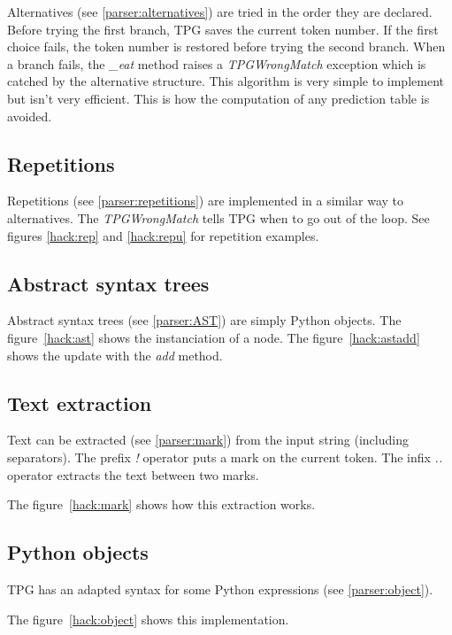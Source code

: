 Alternatives (see \ref{parser:alternatives}) are tried in the order they are declared.
Before trying the first branch, TPG saves the current token number.
If the first choice fails, the token number is restored before trying the second branch.
When a branch fails, the \emph{\_eat} method raises a \emph{TPGWrongMatch} exception which is catched by the alternative structure.
This algorithm is very simple to implement but isn't very efficient.
This is how the computation of any prediction table is avoided.


\clearpage
\subsection{Repetitions}									\label{hack:repetitions}

Repetitions (see \ref{parser:repetitions}) are implemented in a similar way to alternatives.
The \emph{TPGWrongMatch} tells TPG when to go out of the loop.
See figures \ref{hack:rep} and \ref{hack:repu} for repetition examples.


\clearpage
\subsection{Abstract syntax trees}

Abstract syntax trees (see \ref{parser:AST}) are simply Python objects.
The figure~\ref{hack:ast} shows the instanciation of a node.
The figure~\ref{hack:astadd} shows the update with the \emph{add} method.


\clearpage
\subsection{Text extraction}

Text can be extracted (see \ref{parser:mark}) from the input string (including separators).
The prefix \emph{!} operator puts a mark on the current token.
The infix \emph{..} operator extracts the text between two marks.

The figure~\ref{hack:mark} shows how this extraction works.


\subsection{Python objects}

TPG has an adapted syntax for some Python expressions (see \ref{parser:object}).

The figure~\ref{hack:object} shows this implementation.


